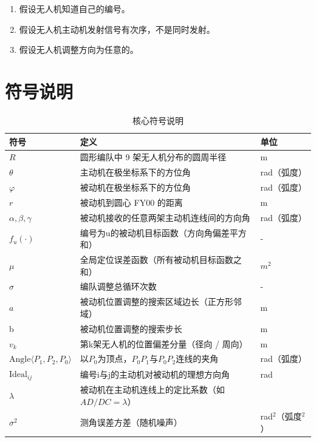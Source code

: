 \documentclass[withoutpreface,bwprint]{cumcmthesis} %
\begin{document}
\begin{enumerate}
    \item 假设无人机知道自己的编号。
    \item 假设无人机主动机发射信号有次序，不是同时发射。
    \item 假设无人机调整方向为任意的。
\end{enumerate}

\section{符号说明}

\begin{table}[H]
    \centering
    \caption{核心符号说明}
    \label{tab_symbols}
    \begin{tabular}{@{}lll@{}}
        \toprule
        \textbf{符号} & \textbf{定义} & \textbf{单位} \\
        \midrule
        $R$  & 圆形编队中 9 架无人机分布的圆周半径 & m\\
        \(\theta\)&主动机在极坐标系下的方位角&rad（弧度）\\
        \(\varphi\)&被动机在极坐标系下的方位角&rad（弧度）\\
        $r$&被动机到圆心 FY00 的距离&m\\
        \(\alpha, \beta, \gamma\) & 被动机接收的任意两架主动机连线间的方向角&rad（弧度） \\ 
        \(f_u(\cdot)\)&编号为u的被动机目标函数（方向角偏差平方和）&-\\
        \(\mu\) & 全局定位误差函数（所有被动机目标函数之和）&$m^2$\\
        \(\sigma\) & 编队调整总循环次数& -\\
        $a$ & 被动机位置调整的搜索区域边长（正方形邻域）& m\\
        b & 被动机位置调整的搜索步长& m\\
        \(v_k\)& 第k架无人机的位置偏差分量（径向 / 周向）& m\\
        \(\text{Angle}\langle P_1, P_2, P_0 \rangle\)& 以\(P_0\)为顶点，\(P_0P_1\)与\(P_0P_2\)连线的夹角&rad（弧度）\\
        \(\text{Ideal}_{ij}\) &  编号i与j的主动机对被动机的理想方向角 & rad \\
        \(\lambda\)&被动机在主动机连线上的定比系数（如\(AD/DC=\lambda\)）\\
        \(\sigma^2\)&测角误差方差（随机噪声）&rad$^2$（弧度$^2$）\\
        \bottomrule
    \end{tabular}
\end{table}
\end{document}

